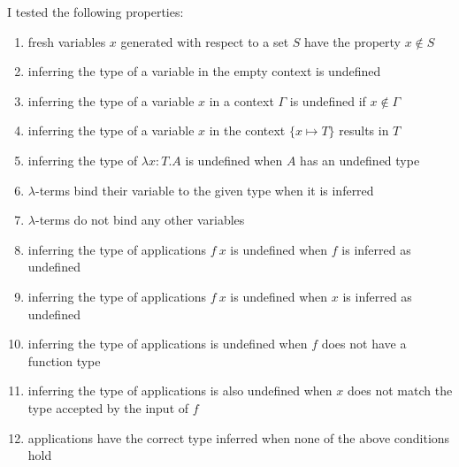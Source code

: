 I tested the following properties:
\begin{enumerate}
\item fresh variables \(x\) generated with respect to a set \(S\) have the property \(x \notin S\)
\item inferring the type of a variable in the empty context is undefined
\item inferring the type of a variable \(x\) in a context \(\Gamma\) is undefined if \(x \notin \Gamma\)
\item inferring the type of a variable \(x\) in the context \(\{x \mapsto T\}\) results in \(T\)
\item inferring the type of \(\lambda x : T.A\) is undefined when \(A\) has an undefined type
\item \(\lambda\)-terms bind their variable to the given type when it is inferred
\item \(\lambda\)-terms do not bind any other variables
\item inferring the type of applications \(f\ x\) is undefined when \(f\) is inferred as undefined
\item inferring the type of applications \(f\ x\) is undefined when \(x\) is inferred as undefined
\item inferring the type of applications is undefined when \(f\) does not have a function type
\item inferring the type of applications is also undefined when \(x\) does not match the type accepted by the input of \(f\)
\item applications have the correct type inferred when none of the above conditions hold
\end{enumerate}


